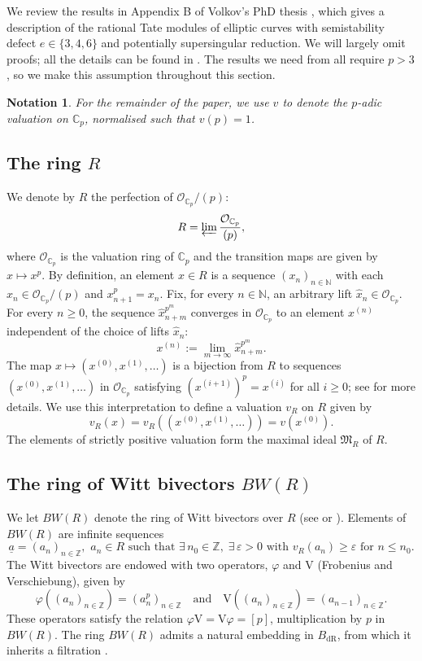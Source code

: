 \documentclass{amsart}
\newtheorem*{notation*}{Notation}
\theoremstyle{definition}
\newcommand{\C}{\mathbb{C}}
\numberwithin{theorem}{section}
\numberwithin{equation}{section}
\begin{document}
We review the results in Appendix B of Volkov's PhD thesis \cite{Volkov}, which gives a description of the rational Tate modules of elliptic curves with semistability defect $e \in \{3, 4, 6\}$ and potentially supersingular reduction. We will largely omit proofs; all the details can be found in \cite{Volkov}. The results we need from \cite{Volkov} all require $p > 3$, so we make this assumption throughout this section.

\begin{notation*}
    For the remainder of the paper, we use $v$ to denote the $p$-adic valuation on $\C_p$, normalised such that $v(p)=1$.
\end{notation*}

\subsection{The ring $R$}
We denote by $R$ the perfection of $\mathcal{O}_{\mathbb{C}_p}/(p)$:
\[
R = \varprojlim \frac{\mathcal{O}_{\mathbb{C}_p}}{(p)},
\]
where $\mathcal{O}_{\mathbb{C}_p}$ is the valuation ring of $\mathbb{C}_p$ and the transition maps are given by $x \mapsto x^p$. 
By definition, an element $x \in R$ is a sequence $(x_n)_{n \in \mathbb{N}}$ with each $x_n \in \mathcal{O}_{\mathbb{C}_p}/(p)$ and $x_{n+1}^p=x_n$. Fix, for every $n \in \mathbb{N}$, an arbitrary lift $\hat{x}_n \in \mathcal{O}_{\mathbb{C}_p}$. For every $n \geq 0$, the sequence $\hat{x}_{n+m}^{p^m}$ converges in $\mathcal{O}_{\mathbb{C}_p}$ to an element $x^{(n)}$ independent of the choice of lifts $\hat{x}_{n}$:
\[
x^{(n)} := \lim_{m \to \infty} \hat{x}_{n+m}^{p^m}.
\]
The map $x \mapsto (x^{(0)}, x^{(1)}, \ldots)$ is a bijection from $R$ to sequences $(x^{(0)}, x^{(1)}, \ldots)$ in $\mathcal{O}_{\mathbb{C}_p}$ satisfying  $(x^{(i+1)})^p = x^{(i)}$ for all $i \geq 0$; see \cite[p.~104]{Volkov} for more details. We use this interpretation to define a valuation $v_R$ on $R$ given by
\[
v_R(x)=v_R((x^{(0)}, x^{(1)}, \ldots))=v(x^{(0)}).
\]
The elements of strictly positive valuation form the maximal ideal $\mathfrak{M}_R$ of $R$. 

\subsection{The ring of Witt bivectors $BW(R)$}
We let $BW(R)$ denote the ring of Witt bivectors over $R$ (see \cite[p.~121]{Volkov} or \cite[\S 6.3]{Fontaine82}). Elements of $BW(R)$ are infinite sequences 
        \[
        \underline{a}=(a_n)_{n \in \mathbb{Z}}, \,\, a_n \in R \text{ such that }\exists \, n_0 \in \mathbb{Z}, \; \exists \, \varepsilon>0 \text{ with } v_R(a_n) \geq \varepsilon \text{ for }n \leq n_0.
        \]
        The Witt bivectors are endowed with two operators, $\varphi$ and $\text{V}$ (Frobenius and Verschiebung), given by
        \[
        \varphi( (a_n)_{n \in \mathbb{Z}}) = (a_n^p)_{n \in \mathbb{Z}}
\quad \text{and}\quad
        \text{V}((a_n)_{n \in \mathbb{Z}}) = (a_{n-1})_{n \in \mathbb{Z}}.
        \]
        These operators satisfy the relation $\varphi \text{V} = \text{V} \varphi = [p]$, multiplication by $p$ in $BW(R)$. The ring $BW(R)$ admits a natural embedding in $B_{\operatorname{dR}}$, from which it inherits a filtration \cite[top of p.~122]{Volkov}.
\end{document}
